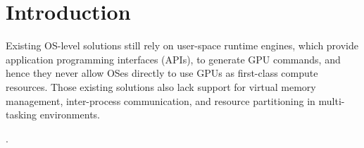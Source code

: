 \section{Introduction}
\label{sec:introduction}

Existing OS-level solutions still rely on user-space runtime
engines, which provide application programming interfaces (APIs), to
generate GPU commands, and hence they never allow OSes directly to use
GPUs as first-class compute resources.
Those existing solutions also lack support for virtual memory
management, inter-process communication, and resource partitioning in
multi-tasking environments.

\cite{Kato_RTSS11}.